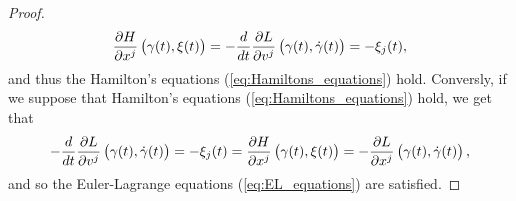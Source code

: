 \begin{proof}
\begin{equation*}
		\frac{\partial H}{\partial x^j}\del[1]{\gamma(t),\xi(t)} = -\frac{d}{dt}\frac{\partial L}{\partial v^j}\del[1]{\gamma(t),\dot{\gamma}(t)} = -\xi_j(t),
	\end{equation*}
	\noindent and thus the Hamilton's equations (\ref{eq:Hamiltons_equations}) hold. Conversly, if we suppose that Hamilton's equations (\ref{eq:Hamiltons_equations}) hold, we get that
	\begin{equation*}
		-\frac{d}{dt}\frac{\partial L}{\partial v^j}\del[1]{\gamma(t),\dot{\gamma}(t)} = -\xi_j(t) = \frac{\partial H}{\partial x^j}\del[1]{\gamma(t),\xi(t)} = -\frac{\partial L}{\partial x^j}\del[1]{\gamma(t),\dot{\gamma}(t)},
	\end{equation*}
	\noindent and so the Euler-Lagrange equations (\ref{eq:EL_equations}) are satisfied.
\end{proof}
